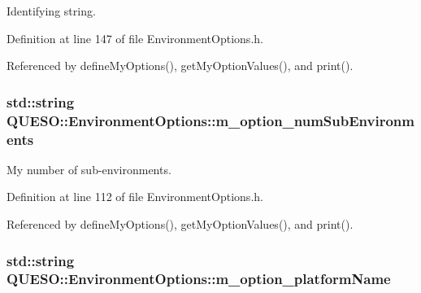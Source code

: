 Identifying string. 



Definition at line 147 of file Environment\-Options.\-h.



Referenced by define\-My\-Options(), get\-My\-Option\-Values(), and print().

\hypertarget{class_q_u_e_s_o_1_1_environment_options_a681529984ebb07b3a2b6684cd3416917}{
\subsubsection[{m\-\_\-option\-\_\-num\-Sub\-Environments}]{\setlength{\rightskip}{0pt plus 5cm}std\-::string Q\-U\-E\-S\-O\-::\-Environment\-Options\-::m\-\_\-option\-\_\-num\-Sub\-Environments\hspace{0.3cm}{\ttfamily [private]}}}\label{class_q_u_e_s_o_1_1_environment_options_a681529984ebb07b3a2b6684cd3416917}


My number of sub-\/environments. 



Definition at line 112 of file Environment\-Options.\-h.



Referenced by define\-My\-Options(), get\-My\-Option\-Values(), and print().

\hypertarget{class_q_u_e_s_o_1_1_environment_options_a7f53c8be62f5b0b32d01f412f6e1f24d}{
\subsubsection[{m\-\_\-option\-\_\-platform\-Name}]{\setlength{\rightskip}{0pt plus 5cm}std\-::string Q\-U\-E\-S\-O\-::\-Environment\-Options\-::m\-\_\-option\-\_\-platform\-Name\hspace{0.3cm}{\ttfamily [private]}}}\label{class_q_u_e_s_o_1_1_environment_options_a7f53c8be62f5b0b32d01f412f6e1f24d}


